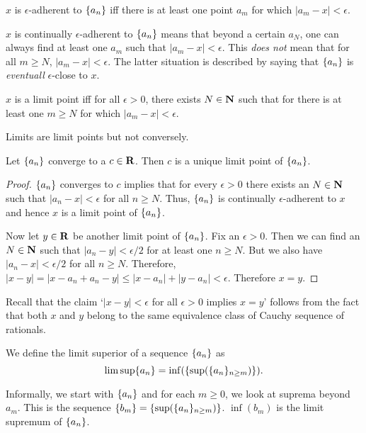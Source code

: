 \begin{rem}
$x$ is $\epsilon$-adherent to $\{a_n\}$ iff there is at least one point
$a_m$ for which $|a_m - x| < \epsilon$.
\end{rem}

\begin{rem}
$x$ is continually $\epsilon$-adherent to $\{a_n\}$ means that beyond a
certain $a_N$, one can always find at least one $a_m$ such that $|a_m - x|
< \epsilon$. This \emph{does not} mean that for all $m \ge N$, $|a_m - x|
< \epsilon$. The latter situation is described by saying that $\{a_n\}$
is \emph{eventuall} $\epsilon$-close to $x$.
\end{rem}

\begin{rem}
$x$ is a limit point iff for all $\epsilon > 0$, there exists $N \in \mathbf{N}$
such that for there is at least one $m \ge N$ for which $|a_m - x| < 
\epsilon$.
\end{rem}

Limits are limit points but not conversely.
\begin{prop}\label{c5s6p1}
Let $\{a_n\}$ converge to a $c \in \mathbf{R}$. Then $c$ is a unique limit point 
of $\{a_n\}$.
\end{prop}
\begin{proof}
$\{a_n\}$ converges to $c$ implies that for every $\epsilon > 0$ there 
exists an $N \in \mathbf{N}$ such that $|a_n - x| < \epsilon$ for all $n \ge N$.
Thus, $\{a_n\}$ is continually $\epsilon$-adherent to $x$ and hence $x$
is a limit point of $\{a_n\}$.

Now let $y \in \mathbf{R}$ be another limit point of $\{a_n\}$. Fix an $\epsilon
> 0$. Then we can find an $N \in \mathbf{N}$ such that $|a_n - y| < \epsilon/2$ for
at least one $n \ge N$. But we also have $|a_n - x| < \epsilon/2$ for all 
$n \ge N$. Therefore, $|x - y| = |x - a_n + a_n - y| \le |x - a_n| + 
|y - a_n| < \epsilon$. Therefore $x = y$.
\end{proof}

\begin{rem}
Recall that the claim `$|x - y| < \epsilon$ for all $\epsilon > 0$ implies
$x = y$' follows from the fact that both $x$ and $y$ belong to the same
equivalence class of Cauchy sequence of rationals.
\end{rem}

\begin{defn}\label{c5s4d2}
We define the limit superior of a sequence $\{a_n\}$ as
\[
\limsup\{a_n\} = \inf(\{\sup(\{a_n\}_{n \ge m})\}). 
\]
\end{defn}
Informally, we start with $\{a_n\}$ and for each $m \ge 0$, we look at 
suprema beyond $a_m$. This is the sequence $\{b_m\} = \{
\sup(\{a_n\}_{n \ge m})\}$. $\inf(b_m)$ is the limit supremum of 
$\{a_n\}$.


